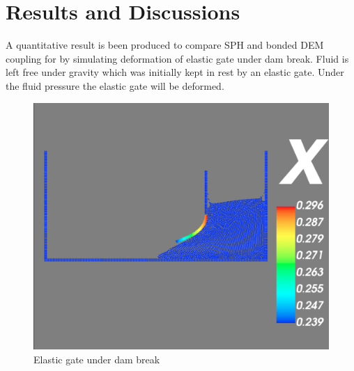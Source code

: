 \chapter{Results and Discussions}


A quantitative result is been produced to compare SPH and bonded DEM coupling
for by simulating deformation of elastic gate under dam break. Fluid is left
free under gravity which was initially kept in rest by an elastic gate. Under
the fluid pressure the elastic gate will be deformed.

\begin{figure}
  \centering
  \label{fig:elastic_gate_result}
  \includegraphics[scale=0.3]{rnd/results_images/elastic_gate}
  \caption{Elastic gate under dam break}
\end{figure}





